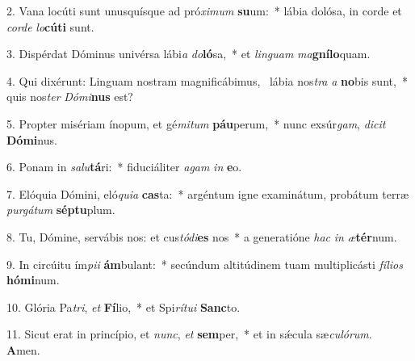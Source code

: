 2. Vana locúti sunt unusquísque ad pró\textit{xi}\textit{mum} \textbf{su}um:~*  lábia dolósa, in corde et \textit{cor}\textit{de} \textit{lo}\textbf{cú}\textbf{ti} sunt.\

3. Dispérdat Dóminus univérsa lábi\textit{a} \textit{do}\textbf{ló}sa,~*  et \textit{lin}\textit{guam} \textit{ma}\textbf{gní}\textbf{lo}quam.\

4. Qui dixérunt: Linguam nostram magnificábimus, \dag\  lábia nos\textit{tra} \textit{a} \textbf{no}bis sunt,~*  quis nos\textit{ter} \textit{Dó}\textit{mi}\textbf{nus} est?\

5. Propter misériam ínopum, et gé\textit{mi}\textit{tum} \textbf{páu}perum,~*  nunc exsúr\textit{gam}, \textit{di}\textit{cit} \textbf{Dó}\textbf{mi}nus.\

6. Ponam in \textit{sa}\textit{lu}\textbf{tá}ri:~*  fiduciáliter \textit{a}\textit{gam} \textit{in} \textbf{e}o.\

7. Elóquia Dómini, eló\textit{qui}\textit{a} \textbf{cas}ta:~*  argéntum igne examinátum, probátum terræ \textit{pur}\textit{gá}\textit{tum} \textbf{sép}\textbf{tu}plum.\

8. Tu, Dómine, servábis nos: et cus\textit{tó}\textit{di}\textbf{es} nos~*  a generatióne \textit{hac} \textit{in} \textit{æ}\textbf{tér}num.\

9. In circúitu ím\textit{pi}\textit{i} \textbf{ám}bulant:~*  secúndum altitúdinem tuam multiplicásti \textit{fí}\textit{li}\textit{os} \textbf{hó}\textbf{mi}num.\

10. Glória Pa\textit{tri}, \textit{et} \textbf{Fí}lio,~*  et Spi\textit{rí}\textit{tu}\textit{i} \textbf{Sanc}to.\

11. Sicut erat in princípio, et \textit{nunc}, \textit{et} \textbf{sem}per,~*  et in sǽcula sæ\textit{cu}\textit{ló}\textit{rum}. \textbf{A}men.\


